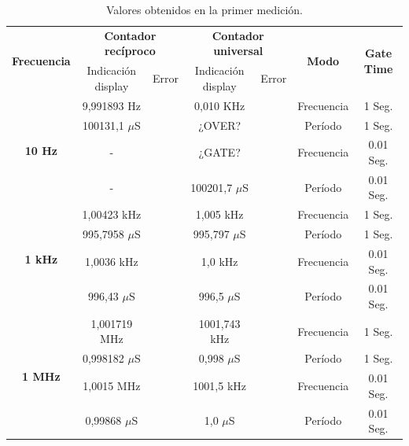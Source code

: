 \documentclass{article}
\begin{document}
\newpage
\begin{table}[!hbt]
	\begin{center}

		\begin{tabular}{|c|c|c|c|c|c|c|} \hline
			\multirow{2}{*}{\textbf{Frecuencia}}
			& \multicolumn{2}{c|}{\textbf{Contador recíproco}} & \multicolumn{2}{c|}{\textbf{Contador universal}} & \multirow{2}{*}{\textbf{Modo}} & \multirow{2}{*}{\textbf{Gate Time}} \\\cline{2-5}
			& Indicación display & Error & Indicación display & Error & & \\\hline
			
			\multirow{4}{*}{\textbf{10 Hz}}
			& 9,991893 Hz &  & 0,010 KHz &  & Frecuencia & 1 Seg. \\\cline{2-7}
			& 100131,1 $\mu$S &  & ¿OVER? &  & Período & 1 Seg. \\\cline{2-7}
			& - &  & ¿GATE? &  & Frecuencia & 0.01 Seg. \\\cline{2-7}
			& - &  & 100201,7 $\mu$S &  & Período & 0.01 Seg. \\\hline

			\multirow{4}{*}{\textbf{1 kHz}}
			& 1,00423 kHz &  & 1,005 kHz &  & Frecuencia & 1 Seg. \\\cline{2-7}
			& 995,7958 $\mu$S &  & 995,797 $\mu$S &  & Período & 1 Seg. \\\cline{2-7}
			& 1,0036 kHz &  & 1,0 kHz &  & Frecuencia & 0.01 Seg. \\\cline{2-7}
			& 996,43 $\mu$S &  & 996,5 $\mu$S &  & Período & 0.01 Seg. \\\hline

			\multirow{4}{*}{\textbf{1 MHz}}
			& 1,001719 MHz &  & 1001,743 kHz &  & Frecuencia & 1 Seg. \\\cline{2-7}
			& 0,998182 $\mu$S &  & 0,998 $\mu$S &  & Período & 1 Seg. \\\cline{2-7}
			& 1,0015 MHz &  & 1001,5 kHz &  & Frecuencia & 0.01 Seg. \\\cline{2-7}
			& 0,99868 $\mu$S &  & 1,0 $\mu$S &  & Período & 0.01 Seg. \\\hline
		\end{tabular}

	\caption{Valores obtenidos en la primer medición.}
	\end{center}
\end{table}
\medskip
\end{document}
